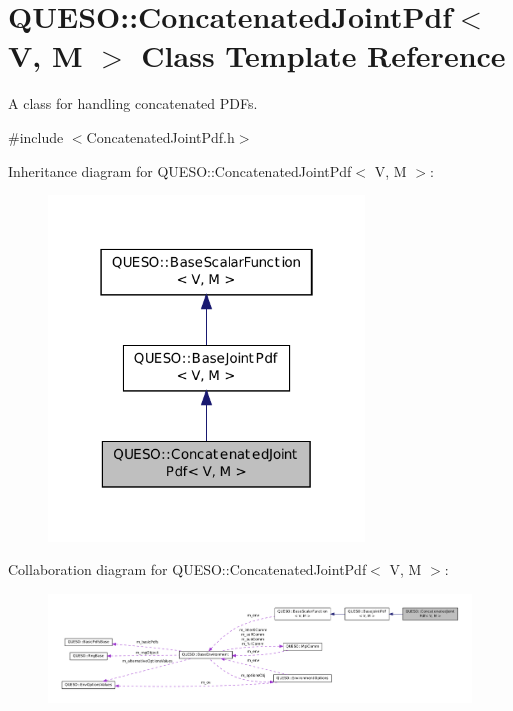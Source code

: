 \hypertarget{class_q_u_e_s_o_1_1_concatenated_joint_pdf}{\section{Q\-U\-E\-S\-O\-:\-:Concatenated\-Joint\-Pdf$<$ V, M $>$ Class Template Reference}
\label{class_q_u_e_s_o_1_1_concatenated_joint_pdf}
}


A class for handling concatenated P\-D\-Fs.  




{\ttfamily \#include $<$Concatenated\-Joint\-Pdf.\-h$>$}



Inheritance diagram for Q\-U\-E\-S\-O\-:\-:Concatenated\-Joint\-Pdf$<$ V, M $>$\-:
\nopagebreak
\begin{figure}[H]
\begin{center}
\leavevmode
\includegraphics[width=238pt]{class_q_u_e_s_o_1_1_concatenated_joint_pdf__inherit__graph}
\end{center}
\end{figure}


Collaboration diagram for Q\-U\-E\-S\-O\-:\-:Concatenated\-Joint\-Pdf$<$ V, M $>$\-:
\nopagebreak
\begin{figure}[H]
\begin{center}
\leavevmode
\includegraphics[width=350pt]{class_q_u_e_s_o_1_1_concatenated_joint_pdf__coll__graph}
\end{center}
\end{figure}
